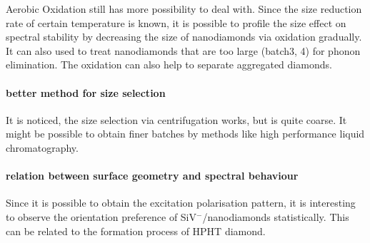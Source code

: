 Aerobic Oxidation still has more possibility to deal with. Since the size reduction rate of certain temperature is known, it is possible to profile the size effect on spectral stability by decreasing the size of nanodiamonds via oxidation gradually. It can also used to treat nanodiamonds that are too large (batch3, 4) for phonon elimination. The oxidation can also help to separate aggregated diamonds.

\paragraph{better method for size selection}
It is noticed, the size selection via centrifugation works, but is quite coarse. It might be possible to obtain finer batches by methods like high performance liquid chromatography. \citep{naoki_komatsu_chromatographic_2011}

\paragraph{relation between surface geometry and spectral behaviour}
Since it is possible to obtain the excitation polarisation pattern, it is interesting to observe the orientation preference of SiV$^{-}$/nanodiamonds statistically. This can be related to the formation process of HPHT diamond.
